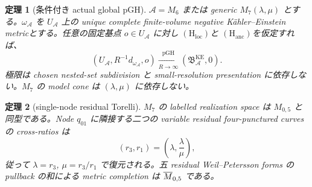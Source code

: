 \documentclass[11pt,a4paper]{ltjsarticle}
\newcommand{\cA}{\mathcal A}\newcommand{\cB}{\mathcal B}\newcommand{\cC}{\mathcal C}
\newcommand{\BKE}{\mathfrak B_{\cA}^{\mathrm{KE}}}
\newcommand{\Hloc}{\ensuremath{(\mathrm H_{\mathrm{loc}})}}
\newcommand{\Hanc}{\ensuremath{(\mathrm H_{\mathrm{anc}})}}
\theoremstyle{plain}
\newtheorem{theorem}{定理}[section]\newtheorem{proposition}[theorem]{命題}
\theoremstyle{definition}
\theoremstyle{remark}
\begin{document}
\begin{theorem}[条件付き actual global pGH]\label{thm:intro-global-pgh}
$\cA=M_6$ または generic $M_7(\lambda,\mu)$ とする。$\omega_{\cA}$ を $U_{\cA}$ 上の unique complete finite-volume negative K\"ahler--Einstein metricとする。任意の固定基点 $o\in U_{\cA}$ に対し
\Hloc と \Hanc を仮定すれば、
\[
 (U_{\cA},R^{-1}d_{\omega_{\cA}},o)
 \xrightarrow[R\to\infty]{\mathrm{pGH}}
 (\BKE,0).
\]
極限は chosen nested-set subdivision と small-resolution presentation に依存しない。$M_7$ の model cone は $(\lambda,\mu)$ に依存しない。
\end{theorem}

\begin{theorem}[single-node residual Torelli]\label{thm:intro-torelli}
$M_7$ の labelled realization space は $M_{0,5}$ と同型である。Node $q_{01}$ に隣接する二つの variable residual four-punctured curves の cross-ratios は
\[
 (r_3,r_1)=\left(\lambda,\frac{\lambda}{\mu}\right),
\]
従って $\lambda=r_3$, $\mu=r_3/r_1$ で復元される。五 residual Weil--Petersson forms の pullback の和による metric completion は $\overline M_{0,5}$ である。
\end{theorem}
\end{document}
